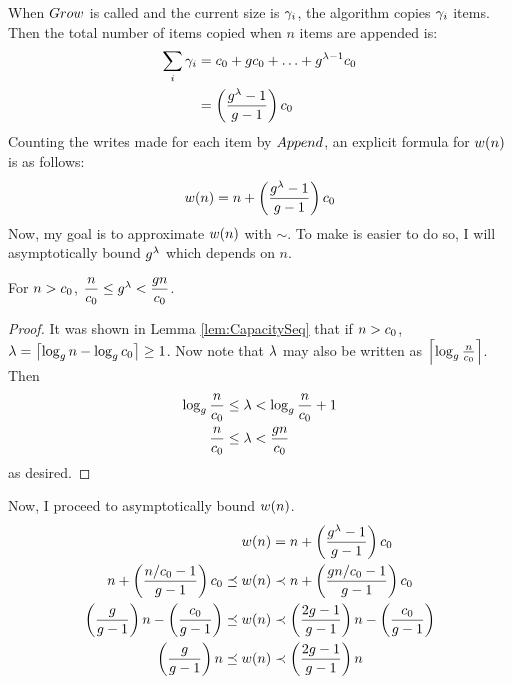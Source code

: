 When $Grow$ is called and the current size is $\gamma_i$, the algorithm copies $\gamma_i$ items. Then the total number of items copied when $n$ items are appended is:
\begin{align*}
\sum_i {\gamma_i} &= c_0 + gc_0 + \ldots + g^{\lambda - 1}c_0\\
&= \left( \frac{g^{\lambda} - 1}{g - 1} \right) c_0
\end{align*}
Counting the writes made for each item by $Append$, an explicit formula for $w(n)$ is as follows:
\begin{align*}
w(n) = n + \left( \frac{g^\lambda - 1}{g - 1} \right) c_0
\end{align*}
Now, my goal is to approximate $w(n)$ with $\sim$. To make is easier to do so, I will asymptotically bound $g^\lambda$ which depends on $n$.

\begin{lemma}
\label{lem:ToVarUsefulPowerBounds}
	For $n > c_0$, $\dfrac n {c_0} \leq g^\lambda < \dfrac {g{n}} {c_0}$.
\end{lemma}

\begin{proof}
	It was shown in Lemma \ref{lem:CapacitySeq} that if $n > c_0$, $\lambda = \left\lceil \log_{g} n - \log_{g} c_0 \right\rceil \geq 1$.  Now note that $\lambda$ may also be written as $\left\lceil \log_{g} \frac {n} {c_0} \right\rceil$. Then
	\begin{align*}
	\log_{g} \frac {n} {c_0} \leq \lambda &< \log_{g} \frac {n} {c_0} + 1\\
	\frac{n}{c_0} \leq \lambda &< \frac{g{n}}{c_0}
	\end{align*}
	as desired.
\end{proof}

Now, I proceed to asymptotically bound $w(n)$.
\begin{align*}
w(n) &= n + \left( \frac{g^\lambda - 1}{g - 1} \right) c_0\\
n + \left( \frac{n / c_0 - 1}{g - 1} \right) c_0 \preceq w(n) &\prec n + \left( \frac{g{n} / c_0 - 1}{g - 1} \right) c_0\\
\left( \frac{g}{g - 1} \right) n - \left( \frac{c_0}{g - 1} \right) \preceq w(n) &\prec \left( \frac{2g - 1}{g - 1} \right) n - \left( \frac{c_0}{g - 1} \right)\\
\left( \frac{g}{g - 1} \right) n \preceq w(n) &\prec \left( \frac{2g - 1}{g - 1} \right) n
\end{align*}
\HdrSpaceComplex


